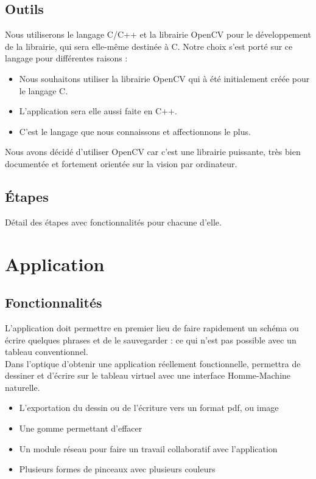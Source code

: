\documentclass{article}
\begin{document}
		\subsection{Outils}
			Nous utiliserons le langage C/C++ et la librairie OpenCV pour le développement de la librairie, qui sera elle-même destinée à C.
Notre choix s'est porté sur ce langage pour différentes raisons :
		\begin{itemize}
			\item Nous souhaitons utiliser la librairie OpenCV qui à été initialement créée pour le langage C.
			\item L'application sera elle aussi faite en C++.
		\item C'est le langage que nous connaissons et affectionnons le plus.
			\end{itemize}
			Nous avons décidé d'utiliser OpenCV car c'est une librairie puissante, très bien documentée et fortement orientée sur la vision par ordinateur. \\
		\subsection{Étapes}
			Détail des étapes avec fonctionnalités pour chacune d'elle.
	\section{Application}
		\subsection{Fonctionnalités}
		L'application doit permettre en premier lieu de faire rapidement un schéma ou écrire quelques phrases
et de le sauvegarder : ce qui n'est pas possible avec un tableau conventionnel. \\ 			
		Dans l'optique d'obtenir une application réellement fonctionnelle, permettra de dessiner 
et d'écrire sur le tableau virtuel avec une interface Homme-Machine naturelle. \\

		\begin{itemize}
			\item L'exportation du dessin ou de l'écriture vers un format pdf, ou image
			\item Une gomme permettant d'effacer	
			\item Un module réseau pour faire un travail collaboratif avec l'application
			\item Plusieurs formes de pinceaux avec plusieurs couleurs
		\end{itemize}
\end{document}

